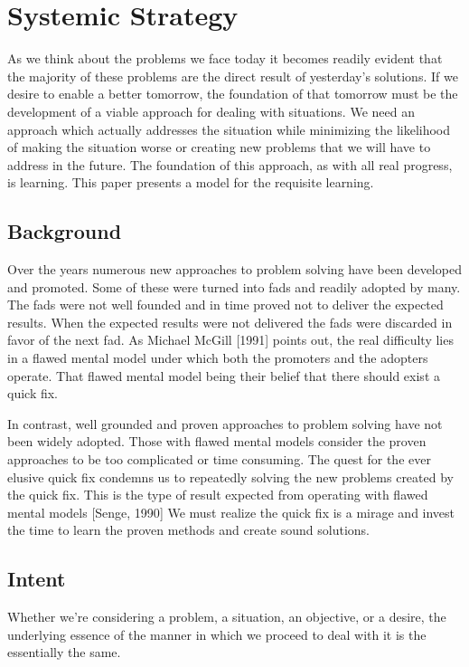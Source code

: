 \documentclass[]{memoir}
\begin{document}
\section{Systemic Strategy}

As we think about the problems we face today it becomes readily evident
that the majority of these problems are the direct result of yesterday's
solutions. If we desire to enable a better tomorrow, the foundation of
that tomorrow must be the development of a viable approach for dealing
with situations. We need an approach which actually addresses the
situation while minimizing the likelihood of making the situation worse
or creating new problems that we will have to address in the future. The
foundation of this approach, as with all real progress, is learning.
This paper presents a model for the requisite learning.

\subsection{Background}

Over the years numerous new approaches to problem solving have been
developed and promoted. Some of these were turned into fads and readily
adopted by many. The fads were not well founded and in time proved not
to deliver the expected results. When the expected results were not
delivered the fads were discarded in favor of the next fad. As Michael
McGill {[}1991{]} points out, the real difficulty lies in a flawed
mental model under which both the promoters and the adopters operate.
That flawed mental model being their belief that there should exist a
quick fix.

In contrast, well grounded and proven approaches to problem solving have
not been widely adopted. Those with flawed mental models consider the
proven approaches to be too complicated or time consuming. The quest for
the ever elusive quick fix condemns us to repeatedly solving the new
problems created by the quick fix. This is the type of result expected
from operating with flawed mental models {[}Senge, 1990{]} We must
realize the quick fix is a mirage and invest the time to learn the
proven methods and create sound solutions.

\subsection{Intent}

Whether we're considering a problem, a situation, an objective, or a
desire, the underlying essence of the manner in which we proceed to deal
with it is the essentially the same.
\end{document}
